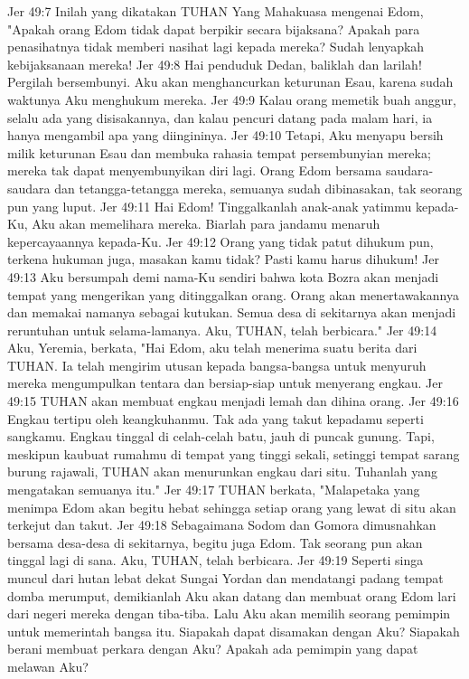 Jer 49:7  Inilah yang dikatakan TUHAN Yang Mahakuasa mengenai Edom, "Apakah orang Edom tidak dapat berpikir secara bijaksana? Apakah para penasihatnya tidak memberi nasihat lagi kepada mereka? Sudah lenyapkah kebijaksanaan mereka!
Jer 49:8  Hai penduduk Dedan, baliklah dan larilah! Pergilah bersembunyi. Aku akan menghancurkan keturunan Esau, karena sudah waktunya Aku menghukum mereka.
Jer 49:9  Kalau orang memetik buah anggur, selalu ada yang disisakannya, dan kalau pencuri datang pada malam hari, ia hanya mengambil apa yang diingininya.
Jer 49:10  Tetapi, Aku menyapu bersih milik keturunan Esau dan membuka rahasia tempat persembunyian mereka; mereka tak dapat menyembunyikan diri lagi. Orang Edom bersama saudara-saudara dan tetangga-tetangga mereka, semuanya sudah dibinasakan, tak seorang pun yang luput.
Jer 49:11  Hai Edom! Tinggalkanlah anak-anak yatimmu kepada-Ku, Aku akan memelihara mereka. Biarlah para jandamu menaruh kepercayaannya kepada-Ku.
Jer 49:12  Orang yang tidak patut dihukum pun, terkena hukuman juga, masakan kamu tidak? Pasti kamu harus dihukum!
Jer 49:13  Aku bersumpah demi nama-Ku sendiri bahwa kota Bozra akan menjadi tempat yang mengerikan yang ditinggalkan orang. Orang akan menertawakannya dan memakai namanya sebagai kutukan. Semua desa di sekitarnya akan menjadi reruntuhan untuk selama-lamanya. Aku, TUHAN, telah berbicara."
Jer 49:14  Aku, Yeremia, berkata, "Hai Edom, aku telah menerima suatu berita dari TUHAN. Ia telah mengirim utusan kepada bangsa-bangsa untuk menyuruh mereka mengumpulkan tentara dan bersiap-siap untuk menyerang engkau.
Jer 49:15  TUHAN akan membuat engkau menjadi lemah dan dihina orang.
Jer 49:16  Engkau tertipu oleh keangkuhanmu. Tak ada yang takut kepadamu seperti sangkamu. Engkau tinggal di celah-celah batu, jauh di puncak gunung. Tapi, meskipun kaubuat rumahmu di tempat yang tinggi sekali, setinggi tempat sarang burung rajawali, TUHAN akan menurunkan engkau dari situ. Tuhanlah yang mengatakan semuanya itu."
Jer 49:17  TUHAN berkata, "Malapetaka yang menimpa Edom akan begitu hebat sehingga setiap orang yang lewat di situ akan terkejut dan takut.
Jer 49:18  Sebagaimana Sodom dan Gomora dimusnahkan bersama desa-desa di sekitarnya, begitu juga Edom. Tak seorang pun akan tinggal lagi di sana. Aku, TUHAN, telah berbicara.
Jer 49:19  Seperti singa muncul dari hutan lebat dekat Sungai Yordan dan mendatangi padang tempat domba merumput, demikianlah Aku akan datang dan membuat orang Edom lari dari negeri mereka dengan tiba-tiba. Lalu Aku akan memilih seorang pemimpin untuk memerintah bangsa itu. Siapakah dapat disamakan dengan Aku? Siapakah berani membuat perkara dengan Aku? Apakah ada pemimpin yang dapat melawan Aku?
